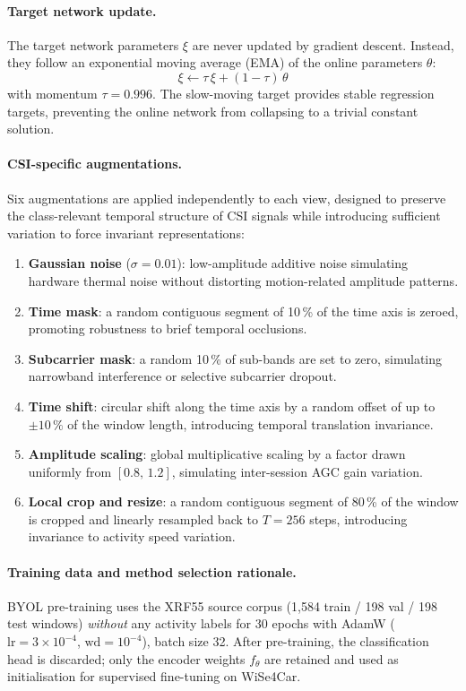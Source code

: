 \documentclass[english,bibtex]{kththesis}
\begin{document}
\paragraph{Target network update.}
The target network parameters $\xi$ are never updated by gradient descent. Instead, they follow an exponential moving average (EMA) of the online parameters $\theta$:
\begin{equation}
  \xi \leftarrow \tau\,\xi + (1 - \tau)\,\theta
\end{equation}
with momentum $\tau = 0.996$. The slow-moving target provides stable regression targets, preventing the online network from collapsing to a trivial constant solution.

\paragraph{CSI-specific augmentations.}
Six augmentations are applied independently to each view, designed to preserve the class-relevant temporal structure of CSI signals while introducing sufficient variation to force invariant representations:
\begin{enumerate}
  \item \textbf{Gaussian noise} ($\sigma = 0.01$): low-amplitude additive noise simulating hardware thermal noise without distorting motion-related amplitude patterns.
  \item \textbf{Time mask}: a random contiguous segment of 10\,\% of the time axis is zeroed, promoting robustness to brief temporal occlusions.
  \item \textbf{Subcarrier mask}: a random 10\,\% of sub-bands are set to zero, simulating narrowband interference or selective subcarrier dropout.
  \item \textbf{Time shift}: circular shift along the time axis by a random offset of up to $\pm 10\,\%$ of the window length, introducing temporal translation invariance.
  \item \textbf{Amplitude scaling}: global multiplicative scaling by a factor drawn uniformly from $[0.8,\, 1.2]$, simulating inter-session AGC gain variation.
  \item \textbf{Local crop and resize}: a random contiguous segment of 80\,\% of the window is cropped and linearly resampled back to $T = 256$ steps, introducing invariance to activity speed variation.
\end{enumerate}

\paragraph{Training data and method selection rationale.}
BYOL pre-training uses the XRF55 source corpus (1{,}584 train / 198 val / 198 test windows) \emph{without} any activity labels for 30 epochs with AdamW ($\mathrm{lr} = 3\!\times\!10^{-4}$, $\mathrm{wd} = 10^{-4}$), batch size 32. After pre-training, the classification head is discarded; only the encoder weights $f_\theta$ are retained and used as initialisation for supervised fine-tuning on WiSe4Car.
\end{document}
